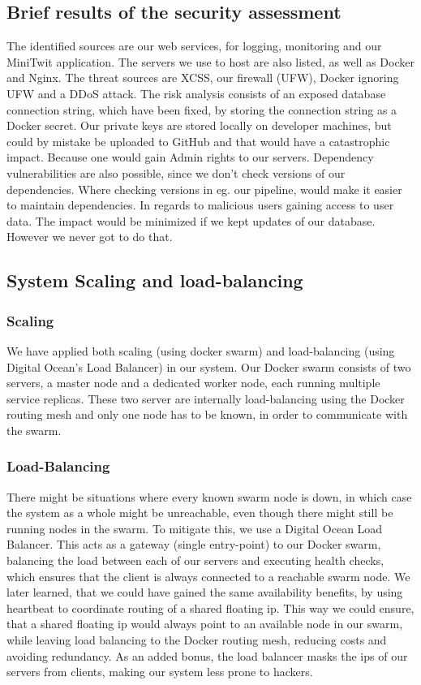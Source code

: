 \subsection{Brief results of the security assessment}
The identified sources are our web services, for logging, monitoring and our MiniTwit application.
The servers we use to host are also listed, as well as Docker and Nginx.
The threat sources are XCSS, our firewall (UFW), Docker ignoring UFW and a DDoS attack.
The risk analysis consists of an exposed database connection string, which have been fixed, by storing the connection string as a Docker secret. Our private keys are stored locally on developer machines, but could by mistake be uploaded to GitHub and that would have a catastrophic impact. Because one would gain Admin rights to our servers.
Dependency vulnerabilities are also possible, since we don't check versions of our dependencies. Where checking versions in eg. our pipeline, would make it easier to maintain dependencies.
In regards to malicious users gaining access to user data. The impact would be minimized if we kept updates of our database. However we never got to do that.

\subsection{System Scaling and load-balancing}
\subsubsection{Scaling}
We have applied both scaling (using docker swarm) and load-balancing (using Digital Ocean's Load Balancer) in our system. 
Our Docker swarm consists of two servers, a master node and a dedicated worker node, each running multiple service replicas. 
These two server are internally load-balancing using the Docker routing mesh and only one node has to be known, in order to communicate with the swarm.

\subsubsection{Load-Balancing}
There might be situations where every known swarm node is down, in which case the system as a whole might be unreachable, even though there might still be running nodes in the swarm.
\newline
To mitigate this, we use a Digital Ocean Load Balancer. This acts as a gateway (single entry-point) to our Docker swarm, balancing the load between each of our servers and executing health checks, which ensures that the client is always connected to a reachable swarm node.
\newline
We later learned, that we could have gained the same availability benefits, by using heartbeat to coordinate routing of a shared floating ip.
This way we could ensure, that a shared floating ip would always point to an available node in our swarm, while leaving load balancing to the Docker routing mesh, reducing costs and avoiding redundancy.
\newline
As an added bonus, the load balancer masks the ips of our servers from clients, making our system less prone to hackers.

